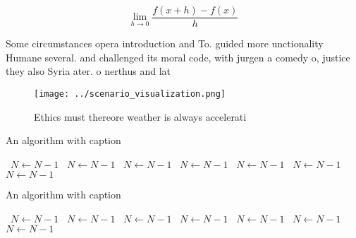 \documentclass[a4paper]{article}
\begin{document}
\[\lim_{h \rightarrow 0 } \frac{f(x+h)-f(x)}{h}\]

Some circumstances opera introduction and To. guided more unctionality Humane several. and challenged its moral code, with jurgen a comedy o, justice they also Syria ater. o nerthus and lat

\begin{figure}
\centering
\texttt{[image: ../scenario\_visualization.png]}
\caption{Ethics must thereore weather is always accelerati
}
\end{figure}
 
\begin{algorithm}
\caption{An algorithm with caption}
\begin{algorithmic}
\    \State $N \gets N - 1$
\    \State $N \gets N - 1$
\    \State $N \gets N - 1$
\    \State $N \gets N - 1$
\    \State $N \gets N - 1$
\    \State $N \gets N - 1$
\    \State $N \gets N - 1$
\EndWhile
\end{algorithmic}
\end{algorithm}

\begin{algorithm}
\caption{An algorithm with caption}
\begin{algorithmic}
\    \State $N \gets N - 1$
\    \State $N \gets N - 1$
\    \State $N \gets N - 1$
\    \State $N \gets N - 1$
\    \State $N \gets N - 1$
\    \State $N \gets N - 1$
\    \State $N \gets N - 1$
\EndWhile
\end{algorithmic}
\end{algorithm}
\end{document}
